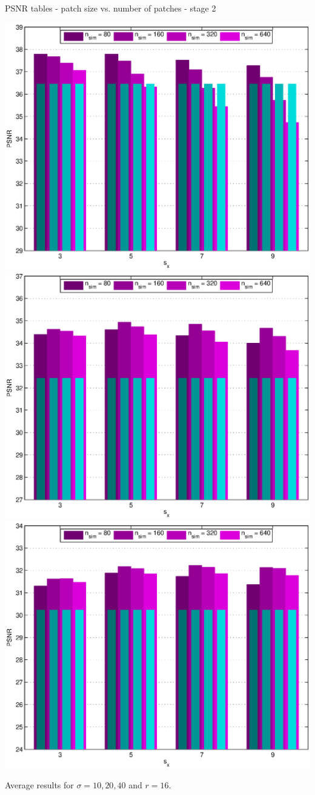 \documentclass[mathserif, 8pt]{beamer}
\begin{document}
\begin{frame}{PSNR tables - patch size vs. number of patches - stage 2}
	\begin{center}
		\includegraphics[width=.33\textwidth]{psnr_px2-np2-bars_2r16_s10_average.eps}%
		\includegraphics[width=.33\textwidth]{psnr_px2-np2-bars_2r16_s20_average.eps}%
		\includegraphics[width=.33\textwidth]{psnr_px2-np2-bars_2r16_s40_average.eps}
	\end{center}
	\begin{center}
	Average results for $\sigma = 10, 20, 40$ and $r = 16$.
	\end{center}
\end{frame}
\end{document}
